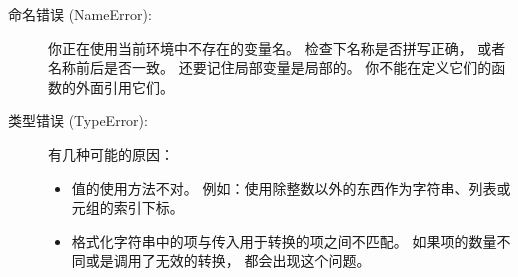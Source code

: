 \begin{description}


\item[命名错误 (NameError):]  你正在使用当前环境中不存在的变量名。  
检查下名称是否拼写正确， 或者名称前后是否一致。  
还要记住局部变量是局部的。  你不能在定义它们的函数的外面引用它们。  


\item[类型错误 (TypeError):]  有几种可能的原因：


\begin{itemize}


\item 值的使用方法不对。  例如：使用除整数以外的东西作为字符串、列表或元组的索引下标。  


\item 格式化字符串中的项与传入用于转换的项之间不匹配。  
如果项的数量不同或是调用了无效的转换， 都会出现这个问题。  



\end{itemize}
\end{description}
